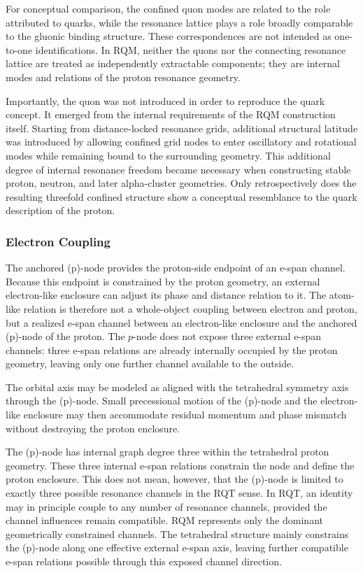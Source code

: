 \documentclass[11pt,a4paper]{article}
\begin{document}
For conceptual comparison, the confined quon modes are related to the role attributed to quarks, while the resonance lattice plays a role broadly comparable to the gluonic binding structure. These correspondences are not intended as one-to-one identifications. In RQM, neither the quons nor the connecting resonance lattice are treated as independently extractable components; they are internal modes and relations of the proton resonance geometry.

Importantly, the quon was not introduced in order to reproduce the quark concept. It emerged from the internal requirements of the RQM construction itself. Starting from distance-locked resonance grids, additional structural latitude was introduced by allowing confined grid nodes to enter oscillatory and rotational modes while remaining bound to the surrounding geometry. This additional degree of internal resonance freedom became necessary when constructing stable proton, neutron, and later alpha-cluster geometries. Only retrospectively does the resulting threefold confined structure show a conceptual resemblance to the quark description of the proton.



\subsubsection{Electron Coupling}

The anchored (p)-node provides the proton-side endpoint of an e-span channel. Because this endpoint is constrained by the proton geometry, an external electron-like enclosure can adjust its phase and distance relation to it. The atom-like relation is therefore not a whole-object coupling between electron and proton, but a realized e-span channel between an electron-like enclosure and the anchored (p)-node of the proton. The \(p\)-node does not expose three external e-span channels: three e-span relations are already internally occupied by the proton geometry, leaving only one further channel available to the outside.

The orbital axis may be modeled as aligned with the tetrahedral symmetry axis through the (p)-node. Small precessional motion of the (p)-node and the electron-like enclosure may then accommodate residual momentum and phase mismatch without destroying the proton enclosure.

The (p)-node has internal graph degree three within the tetrahedral proton geometry. These three internal e-span relations constrain the node and define the proton enclosure. This does not mean, however, that the (p)-node is limited to exactly three possible resonance channels in the RQT sense. In RQT, an identity may in principle couple to any number of resonance channels, provided the channel influences remain compatible. RQM represents only the dominant geometrically constrained channels. The tetrahedral structure mainly constrains the (p)-node along one effective external e-span axis, leaving further compatible e-span relations possible through this exposed channel direction.
\end{document}
